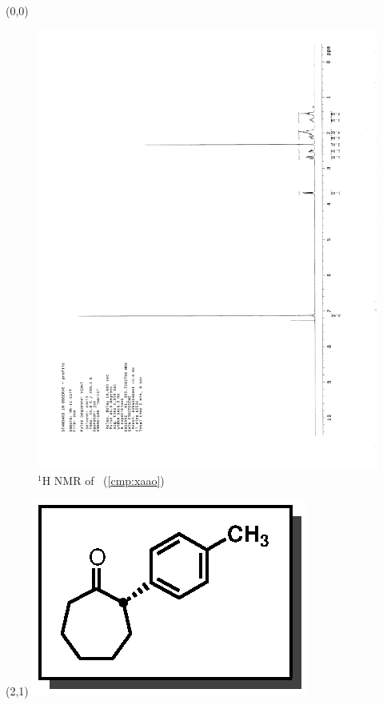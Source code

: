 \begin{textblock}{20}(0,0)
\begin{figure}[htb]
\caption{$^1$H NMR of \CMPxaao\ (\ref{cmp:xaao})}
\includegraphics[scale=0.75, trim = 0mm 0mm 0mm 5mm,
clip]{chp_asymmetric/images/nmr/xaaoH}
\vspace{-100pt}
\end{figure}
\end{textblock}
\begin{textblock}{1}(2,1)
\includegraphics[scale=0.8, angle=90]{chp_asymmetric/images/xaao}
\end{textblock}
